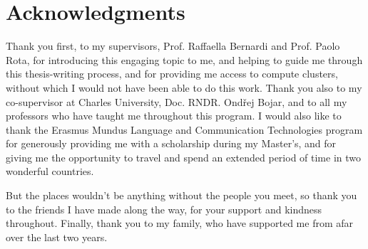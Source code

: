 

\LogoWidth{10cm} %

\begin{titlepage}
    \pagestyle{empty}
    \makefrontpage
    \restoregeometry
\end{titlepage}

\frontmatter

\chapter*{Acknowledgments}

Thank you first, to my supervisors, Prof. Raffaella Bernardi and Prof. Paolo
Rota, for introducing this engaging topic to me, and helping to guide me
through this thesis-writing process, and for providing me access to compute
clusters, without which I would not have been able to do this work. Thank you
also to my co-supervisor at Charles University, Doc. RNDR. Ondřej Bojar, and to
all my professors who have taught me throughout this program. I would also like
to thank the Erasmus Mundus Language and Communication Technologies program for
generously providing me with a scholarship during my Master's, and for giving
me the opportunity to travel and spend an extended period of time in two
wonderful countries. 

But the places wouldn't be anything without the people you meet, so thank you
to the friends I have made along the way, for your support and kindness
throughout. Finally, thank you to my family, who have supported me from afar
over the last two years.


